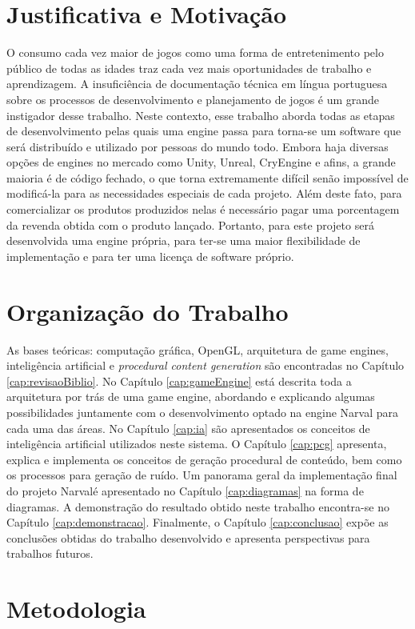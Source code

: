 \documentclass[12pt, 
openright, 
oneside, 
a4paper,    
brazil]{facom-ufu-abntex2}
\begin{document}
\section{Justificativa e Motivação}
O consumo cada vez maior de jogos como uma forma de entretenimento pelo público de todas as idades traz cada vez mais oportunidades de trabalho e aprendizagem.
A insuficiência de documentação técnica em língua portuguesa sobre os processos de desenvolvimento e planejamento de jogos é um grande instigador desse trabalho. Neste contexto, esse trabalho aborda todas as etapas de desenvolvimento pelas quais uma engine passa para torna-se um software que será distribuído e utilizado por pessoas do mundo todo.
Embora haja diversas opções de engines no mercado como Unity, Unreal, CryEngine e afins, a grande maioria é de código fechado, o que torna extremamente difícil senão impossível de modificá-la para as necessidades especiais de cada projeto. Além deste fato, para comercializar os produtos produzidos nelas é necessário pagar uma porcentagem da revenda obtida com o produto lançado. Portanto, para este projeto será desenvolvida uma engine própria, para ter-se uma maior flexibilidade de implementação e para ter uma licença de software próprio.

\section{Organização do Trabalho}
 As bases teóricas: computação gráfica, OpenGL, arquitetura de game engines, inteligência artificial e \textit{procedural content generation} são encontradas no Capítulo \ref{cap:revisaoBiblio}. No Capítulo \ref{cap:gameEngine} está descrita toda a arquitetura por trás de uma game engine, abordando e explicando algumas possibilidades juntamente com o desenvolvimento optado na engine Narval para cada uma das áreas. No Capítulo \ref{cap:ia} são apresentados os conceitos de inteligência artificial utilizados neste sistema. O Capítulo \ref{cap:pcg} apresenta, explica e implementa os conceitos de geração procedural de conteúdo, bem como os processos para geração de ruído. Um panorama geral da implementação final do projeto Narvalé apresentado no Capítulo \ref{cap:diagramas} na forma de diagramas. A demonstração do resultado obtido neste trabalho encontra-se no Capítulo \ref{cap:demonstracao}. Finalmente, o Capítulo \ref{cap:conclusao} expõe as conclusões obtidas do trabalho desenvolvido e apresenta perspectivas para trabalhos futuros.


\iffalse
\section{Metodologia}
\end{document}
